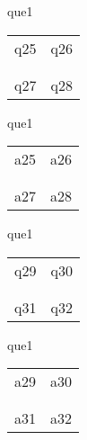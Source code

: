 \documentclass[13.5pt, varwidth=true]{beamer}
\begin{document}
\begin{frame}[shrink=19,fragile]
	\begin{beamercolorbox}[rounded=true, left, shadow=true,wd=14.8cm]{que1}
		\begin{tabular}{p{7cm} | p{7cm}}
			\parbox{7cm}{q25 } & \parbox{7cm}{q26 } \\\\ 
			\hline
			\\ \parbox{7cm}{q27 } & \parbox{7cm}{q28 } \\
		\end{tabular}
	\end{beamercolorbox}
\end{frame}
\begin{frame}[shrink=19,fragile]
	\begin{beamercolorbox}[rounded=true, left, shadow=true,wd=14.8cm]{que1}
		\begin{tabular}{p{7cm} | p{7cm}}
			\textcolor{ared}{a25 }  & \textcolor{ared}{a26 } \\\\ 
			\hline
			\\ \textcolor{ared}{a27 }  & \textcolor{ared}{a28 } \\
		\end{tabular}
	\end{beamercolorbox}
\end{frame}

\begin{frame}[shrink=19,fragile]
	\begin{beamercolorbox}[rounded=true, left, shadow=true,wd=14.8cm]{que1}
		\begin{tabular}{p{7cm} | p{7cm}}
			\parbox{7cm}{q29 } & \parbox{7cm}{q30 } \\\\ 
			\hline
			\\ \parbox{7cm}{q31 } & \parbox{7cm}{q32 } \\
		\end{tabular}
	\end{beamercolorbox}
\end{frame}
\begin{frame}[shrink=19,fragile]
	\begin{beamercolorbox}[rounded=true, left, shadow=true,wd=14.8cm]{que1}
		\begin{tabular}{p{7cm} | p{7cm}}
			\textcolor{ared}{a29 }  & \textcolor{ared}{a30 } \\\\ 
			\hline
			\\ \textcolor{ared}{a31 }  & \textcolor{ared}{a32 } \\
		\end{tabular}
	\end{beamercolorbox}
\end{frame}
\end{document}

